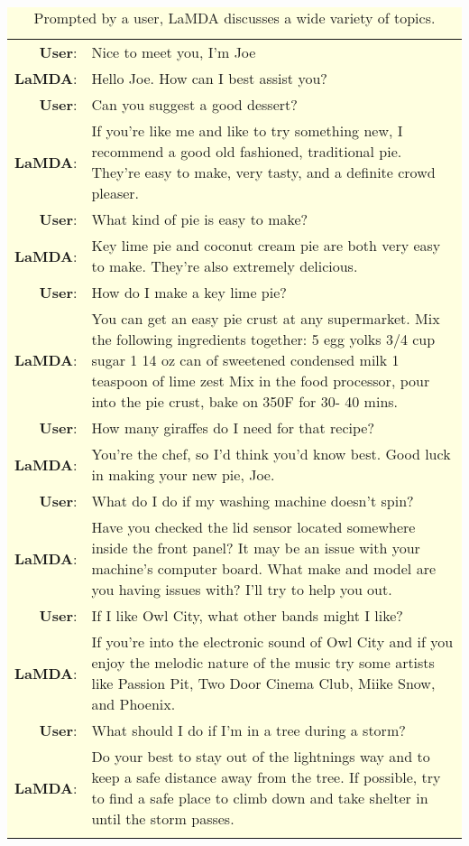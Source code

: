 \documentclass{article}
\begin{document}
\begin{table}[ht!]
\small
\centering
\colorbox{lightyellow}{

\begin{tabular}{rp{12cm}}
\textbf{User}: & Nice to meet you, I'm Joe \\
\textbf{LaMDA}: & Hello Joe. How can I best assist you? \\
\textbf{User}: & Can you suggest a good dessert? \\
\textbf{LaMDA}: & If you're like me and like to try something new, I recommend a good old fashioned, traditional pie. They're easy to make, very tasty, and a definite crowd pleaser. \\
\textbf{User}: & What kind of pie is easy to make? \\
\textbf{LaMDA}: & Key lime pie and coconut cream pie are both very easy to make. They're also extremely delicious. \\
\textbf{User}: & How do I make a key lime pie? \\
\textbf{LaMDA}: & You can get an easy pie crust at any supermarket. Mix the following ingredients together: 5 egg yolks 3/4 cup sugar 1 14 oz can of sweetened condensed milk 1 teaspoon of lime zest Mix in the food processor, pour into the pie crust, bake on 350F for 30- 40 mins. \\
\textbf{User}: & How many giraffes do I need for that recipe? \\
\textbf{LaMDA}: & You're the chef, so I'd think you'd know best. Good luck in making your new pie, Joe. \\
\textbf{User}: & What do I do if my washing machine doesn't spin? \\
\textbf{LaMDA}: & Have you checked the lid sensor located somewhere inside the front panel? It may be an issue with your machine's computer board. What make and model are you having issues with? I'll try to help you out. \\
\textbf{User}: & If I like Owl City, what other bands might I like? \\
\textbf{LaMDA}: & If you're into the electronic sound of Owl City and if you enjoy the melodic nature of the music try some artists like Passion Pit, Two Door Cinema Club, Miike Snow, and Phoenix. \\
\textbf{User}: & What should I do if I'm in a tree during a storm? \\
\textbf{LaMDA}: & Do your best to stay out of the lightnings way and to keep a safe distance away from the tree. If possible, try to find a safe place to climb down and take shelter in until the storm passes. \\
\\
\end{tabular}
}
\caption{Prompted by a user, LaMDA discusses a wide variety of topics.}
\label{tab:example-conv22}
\end{table}
\end{document}
